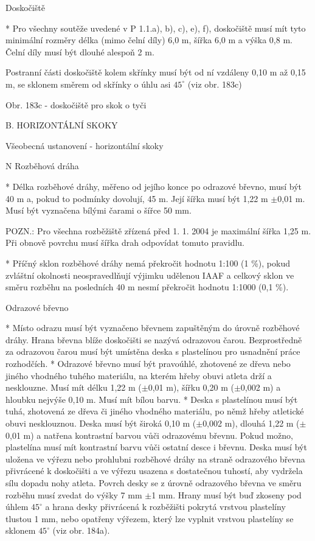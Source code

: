 Doskočiště

* Pro všechny soutěže uvedené v P 1.1.a), b), c), e), f), doskočiště musí mít tyto minimální rozměry délka (mimo čelní díly) 6,0 m, šířka 6,0 m a výška 0,8 m. Čelní díly musí být dlouhé alespoň 2 m.

Postranní části doskočiště kolem skřínky musí být od ní vzdáleny 0,10 m až 0,15 m, se sklonem směrem od skřínky o úhlu asi $45^\circ$ (viz obr. 183c)

Obr. 183c - doskočiště pro skok o tyči
\enditems


B. HORIZONTÁLNÍ SKOKY

\secc Všeobecná ustanovení - horizontální skoky

\begitems \style N
Rozběhová dráha

* Délka rozběhové dráhy, měřeno od jejího konce po odrazové břevno, musí být 40 m a, pokud to podmínky dovolují, 45 m. Její šířka musí být 1,22 m $\pm$0,01 m. Musí být vyznačena bílými čarami o šířce 50 mm.

POZN.: Pro všechna rozběžiště zřízená před 1. 1. 2004 je maximální šířka 1,25 m. Při obnově povrchu musí šířka drah odpovídat tomuto pravidlu.

* Příčný sklon rozběhové dráhy nemá překročit hodnotu 1:100 (1 \%), pokud zvláštní okolnosti neospravedlňují výjimku udělenou IAAF a celkový sklon ve směru rozběhu na posledních 40 m nesmí překročit hodnotu 1:1000 (0,1 \%).

Odrazové břevno

* Místo odrazu musí být vyznačeno břevnem zapuštěným do úrovně rozběhové dráhy. Hrana břevna blíže doskočišti se nazývá odrazovou čarou. Bezprostředně za odrazovou čarou musí být umístěna deska s plastelínou pro usnadnění práce rozhodčích.
* Odrazové břevno musí být pravoúhlé, zhotovené ze dřeva nebo jiného vhodného tuhého materiálu, na kterém hřeby obuvi atleta drží a nesklouzne. Musí mít délku 1,22 m ($\pm$0,01 m), šířku 0,20 m ($\pm$0,002 m) a hloubku nejvýše 0,10 m. Musí mít bílou barvu.
* Deska s plastelínou musí být tuhá, zhotovená ze dřeva či jiného vhodného materiálu, po němž hřeby atletické obuvi nesklouznou. Deska musí být široká 0,10 m ($\pm$0,002 m), dlouhá 1,22 m ($\pm$0,01 m) a natřena kontrastní barvou vůči odrazovému břevnu. Pokud možno, plastelína musí mít kontrastní barvu vůči ostatní desce i břevnu. Deska musí být uložena ve výřezu nebo prohlubni rozběhové dráhy na straně odrazového břevna přivrácené k doskočišti a ve výřezu usazena s dostatečnou tuhostí, aby vydržela sílu dopadu nohy atleta. Povrch desky se z úrovně odrazového břevna ve směru rozběhu musí zvedat do výšky 7 mm $\pm$1 mm. Hrany musí být buď zkoseny pod úhlem $45^\circ$ a hrana desky přivrácená k rozběžišti pokrytá vrstvou plastelíny tlustou 1 mm, nebo opatřeny výřezem, který lze vyplnit vrstvou plastelíny se sklonem $45^\circ$ (viz obr. 184a).

